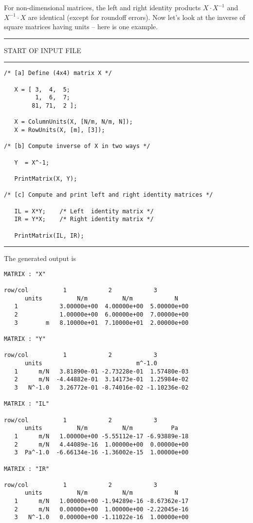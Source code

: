 \vspace{0.15 in}\noindent
For non-dimensional matrices, the left and right identity products
$X \cdot X^{-1}$ and $X^{-1} \cdot X$ are identical (except for roundoff errors).
Now let's look at the inverse of square matrices
having units -- here is one example.

\vspace{0.15 in}
\begin{footnotesize}
\noindent
{\rule{2.3 in}{0.035 in} START OF INPUT FILE \rule{2.3 in}{0.035 in} }
\begin{verbatim}
/* [a] Define (4x4) matrix X */

   X = [ 3,  4,  5;
         1,  6,  7;
        81, 71,  2 ];

   X = ColumnUnits(X, [N/m, N/m, N]);
   X = RowUnits(X, [m], [3]);

/* [b] Compute inverse of X in two ways */

   Y  = X^-1;

   PrintMatrix(X, Y);

/* [c] Compute and print left and right identity matrices */

   IL = X*Y;    /* Left  identity matrix */
   IR = Y*X;    /* Right identity matrix */

   PrintMatrix(IL, IR);
\end{verbatim}
\rule{6.25 in}{0.035 in}
\end{footnotesize}

\vspace{0.15 in}\noindent
The generated output is

\begin{footnotesize}
\begin{verbatim}
MATRIX : "X"

row/col          1            2            3          
      units          N/m          N/m            N   
   1            3.00000e+00  4.00000e+00  5.00000e+00
   2            1.00000e+00  6.00000e+00  7.00000e+00
   3        m   8.10000e+01  7.10000e+01  2.00000e+00

MATRIX : "Y"

row/col          1            2            3          
      units                           m^-1.0   
   1      m/N   3.81890e-01 -2.73228e-01  1.57480e-03
   2      m/N  -4.44882e-01  3.14173e-01  1.25984e-02
   3   N^-1.0   3.26772e-01 -8.74016e-02 -1.10236e-02

MATRIX : "IL"

row/col          1            2            3          
      units          N/m          N/m           Pa   
   1      m/N   1.00000e+00 -5.55112e-17 -6.93889e-18
   2      m/N   4.44089e-16  1.00000e+00  0.00000e+00
   3  Pa^-1.0  -6.66134e-16 -1.36002e-15  1.00000e+00

MATRIX : "IR"

row/col          1            2            3          
      units          N/m          N/m            N   
   1      m/N   1.00000e+00 -1.94289e-16 -8.67362e-17
   2      m/N   0.00000e+00  1.00000e+00 -2.22045e-16
   3   N^-1.0   0.00000e+00 -1.11022e-16  1.00000e+00
\end{verbatim}
\end{footnotesize}

